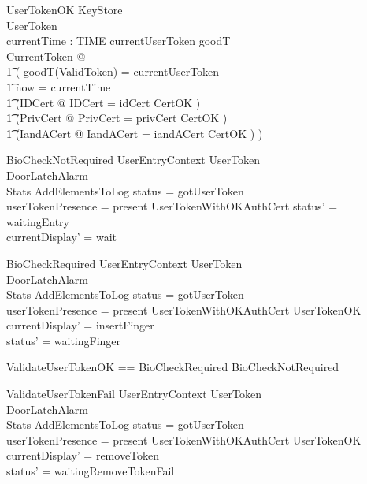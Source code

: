 \begin{schema}{UserTokenOK}
        KeyStore
\\      UserToken
\\      currentTime : TIME
\where
 	currentUserToken \in \ran goodT
\\	\exists CurrentToken @ 
\\ \t1		(
		goodT(\theta ValidToken) = currentUserToken
\\ \t1		\land now = currentTime
\\ \t1          \land (\exists IDCert @ \theta IDCert = idCert \land CertOK )
\\ \t1          \land (\exists PrivCert @ \theta PrivCert = privCert
\land CertOK )
\\ \t1          \land (\exists IandACert @ \theta IandACert =
iandACert \land CertOK )  
                )
\end{schema}

\begin{schema}{BioCheckNotRequired}
        UserEntryContext
\also
        \Xi UserToken
\\      \Xi DoorLatchAlarm        
\\      \Xi Stats
\also
        AddElementsToLog
\where
        status = gotUserToken
\\      userTokenPresence = present
\also
        UserTokenWithOKAuthCert
\also
        status' = waitingEntry
\\      currentDisplay' = wait
\end{schema}

\begin{schema}{BioCheckRequired}
        UserEntryContext
\also
        \Xi UserToken
\\      \Xi DoorLatchAlarm        
\\      \Xi Stats
\also
        AddElementsToLog
\where
        status = gotUserToken
\\      userTokenPresence = present
\also
        \lnot UserTokenWithOKAuthCert \land UserTokenOK
\also
	currentDisplay' = insertFinger
\\	status' = waitingFinger
\end{schema}

\begin{zed}
ValidateUserTokenOK == BioCheckRequired \lor BioCheckNotRequired
\end{zed}

\begin{schema}{ValidateUserTokenFail}
        UserEntryContext
\also
        \Xi UserToken
\\      \Xi DoorLatchAlarm
\\      \Xi Stats       
\also
        AddElementsToLog
\where
        status = gotUserToken
\\      userTokenPresence = present
\also
        \lnot UserTokenWithOKAuthCert \land \lnot UserTokenOK 
\also
        currentDisplay' = removeToken
\\      status' = waitingRemoveTokenFail
\end{schema}

